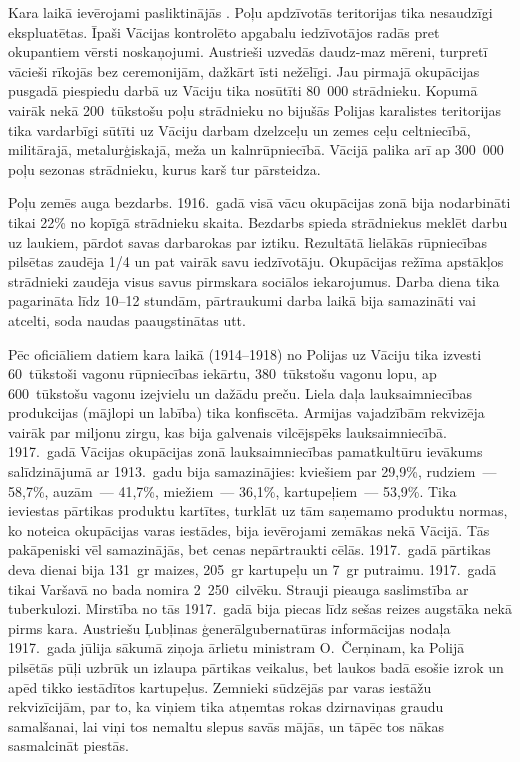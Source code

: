 \documentclass[twoside,a5paper,12pt,fleqn,openany]{extbook}
\begin{document}
Kara laikā ievērojami pasliktinājās . Poļu apdzīvotās teritorijas tika nesaudzīgi ekspluatētas. Īpaši Vācijas kontrolēto apgabalu iedzīvotājos radās pret okupantiem vērsti noskaņojumi. Austrieši uzvedās daudz-maz mēreni, turpretī vācieši rīkojās bez ceremonijām, dažkārt īsti nežēlīgi. Jau pirmajā okupācijas pusgadā piespiedu darbā uz Vāciju tika nosūtīti 80~000 strādnieku. Kopumā vairāk nekā 200~tūkstošu poļu strādnieku no bijušās Polijas karalistes teritorijas tika vardarbīgi sūtīti uz Vāciju darbam dzelzceļu un zemes ceļu celtniecībā, militārajā, metalurģiskajā, meža un kalnrūpniecībā. Vācijā palika arī ap 300~000 poļu sezonas strādnieku, kurus karš tur pārsteidza.

Poļu zemēs auga bezdarbs. 1916.~gadā visā vācu okupācijas zonā bija nodarbināti tikai 22\% no kopīgā strādnieku skaita. Bezdarbs spieda strādniekus meklēt darbu uz laukiem, pārdot savas darbarokas par iztiku. Rezultātā lielākās rūpniecības pilsētas zaudēja 1/4 un pat vairāk savu iedzīvotāju. Okupācijas režīma apstākļos strādnieki zaudēja visus savus pirmskara sociālos iekarojumus. Darba diena tika pagarināta līdz 10--12 stundām, pārtraukumi darba laikā bija samazināti vai atcelti, soda naudas paaugstinātas utt.

Pēc oficiāliem datiem kara laikā (1914--1918) no Polijas uz Vāciju tika izvesti 60~tūkstoši vagonu rūpniecības iekārtu, 380~tūkstošu vagonu lopu, ap 600~tūkstošu vagonu izejvielu un dažādu preču. Liela daļa lauksaimniecības produkcijas (mājlopi un labība) tika konfiscēta. Armijas vajadzībām rekvizēja vairāk par miljonu zirgu, kas bija galvenais vilcējspēks lauksaimniecībā. 1917.~gadā Vācijas okupācijas zonā lauksaimniecības pamatkultūru ievākums salīdzinājumā ar 1913.~gadu bija samazinājies: kviešiem par 29,9\%, rudziem~--- 58,7\%, auzām~--- 41,7\%, miežiem~--- 36,1\%, kartupeļiem~--- 53,9\%. Tika ieviestas pārtikas produktu kartītes, turklāt uz tām saņemamo produktu normas, ko noteica okupācijas varas iestādes, bija ievērojami zemākas nekā Vācijā. Tās pakāpeniski vēl samazinājās, bet cenas nepārtraukti cēlās. 1917.~gadā pārtikas deva dienai bija 131~gr maizes, 205~gr kartupeļu un 7~gr putraimu. 1917.~gadā tikai Varšavā no bada nomira 2~250~cilvēku. Strauji pieauga saslimstība ar tuberkulozi. Mirstība no tās 1917.~gadā bija piecas līdz sešas reizes augstāka nekā pirms kara. Austriešu Ļubļinas ģenerālgubernatūras informācijas nodaļa 1917.~gada jūlija sākumā ziņoja ārlietu ministram O.~Čerņinam, ka Polijā pilsētās pūļi uzbrūk un izlaupa pārtikas veikalus, bet laukos badā esošie izrok un apēd tikko iestādītos kartupeļus. Zemnieki sūdzējās par varas iestāžu rekvizīcijām, par to, ka viņiem tika atņemtas rokas dzirnaviņas graudu samalšanai, lai viņi tos nemaltu slepus savās mājās, un tāpēc tos nākas sasmalcināt piestās.
\end{document}
